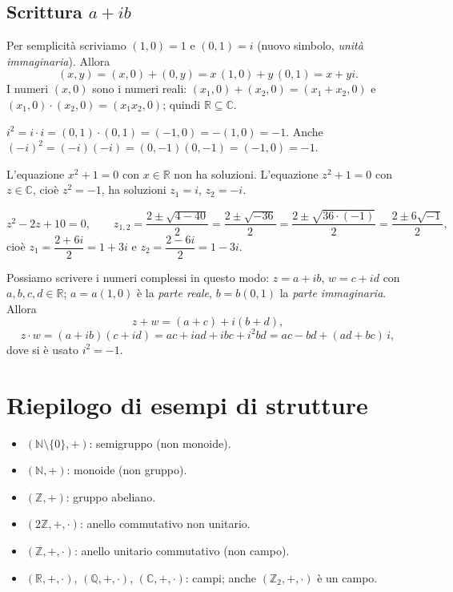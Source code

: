 \documentclass[11pt,a4paper]{article}
\begin{document}
\subsection{Scrittura $a + ib$}

Per semplicità scriviamo $(1, 0) = 1$ e $(0, 1) = i$ (nuovo simbolo, \emph{unità immaginaria}). Allora
\[
  (x, y) = (x, 0) + (0, y) = x\,(1, 0) + y\,(0, 1) = x + yi .
\]
I numeri $(x, 0)$ sono i numeri reali: $(x_1, 0) + (x_2, 0) = (x_1 + x_2, 0)$ e $(x_1, 0)\cdot(x_2, 0) = (x_1 x_2, 0)$; quindi $\mathbb{R} \subseteq \mathbb{C}$.

\begin{osservazione}
$i^2 = i\cdot i = (0, 1)\cdot(0, 1) = (-1, 0) = -(1, 0) = -1$. Anche $(-i)^2 = (-i)(-i) = (0, -1)(0, -1) = (-1, 0) = -1$.
\end{osservazione}

L'equazione $x^2 + 1 = 0$ con $x \in \mathbb{R}$ non ha soluzioni. L'equazione $z^2 + 1 = 0$ con $z \in \mathbb{C}$, cioè $z^2 = -1$, ha soluzioni $z_1 = i$, $z_2 = -i$.

\begin{esempio}
\[
  z^2 - 2z + 10 = 0, \qquad
  z_{1,2} = \frac{2 \pm \sqrt{4 - 40}}{2} = \frac{2 \pm \sqrt{-36}}{2} = \frac{2 \pm \sqrt{36\cdot(-1)}}{2} = \frac{2 \pm 6\sqrt{-1}}{2} ,
\]
cioè $z_1 = \dfrac{2 + 6i}{2} = 1 + 3i$ e $z_2 = \dfrac{2 - 6i}{2} = 1 - 3i$.
\end{esempio}

Possiamo scrivere i numeri complessi in questo modo: $z = a + ib$, $w = c + id$ con $a, b, c, d \in \mathbb{R}$; $a = a(1, 0)$ è la \emph{parte reale}, $b = b(0, 1)$ la \emph{parte immaginaria}. Allora
\[
  z + w = (a + c) + i(b + d),
\]
\[
  z \cdot w = (a + ib)(c + id) = ac + iad + ibc + i^2 bd = ac - bd + (ad + bc)\,i ,
\]
dove si è usato $i^2 = -1$.

\section{Riepilogo di esempi di strutture}

\begin{itemize}
  \item $(\mathbb{N}\setminus\{0\}, +)$: semigruppo (non monoide).
  \item $(\mathbb{N}, +)$: monoide (non gruppo).
  \item $(\mathbb{Z}, +)$: gruppo abeliano.
  \item $(2\mathbb{Z}, +, \cdot)$: anello commutativo non unitario.
  \item $(\mathbb{Z}, +, \cdot)$: anello unitario commutativo (non campo).
  \item $(\mathbb{R}, +, \cdot)$, $(\mathbb{Q}, +, \cdot)$, $(\mathbb{C}, +, \cdot)$: campi; anche $(\mathbb{Z}_2, +, \cdot)$ è un campo.
\end{itemize}
\end{document}
